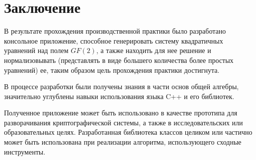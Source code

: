 \chapter*{Заключение} \label{ch-conclusion}

В результате прохождения производственной практики было разработано консольное приложение, способное генерировать систему квадратичных уравнений над полем \(GF(2)\), а также находить для нее решение и нормализовывать (представлять в виде большего количества более простых уравнений) ее, таким образом цель прохождения практики достигнута.

В процессе разработки были получены знания в части основ общей алгебры, значительно углублены навыки использования языка C++ и его библиотек.

Полученное приложение может быть использовано в качестве прототипа для разворачивания криптографической системы, а также в исследовательских или образовательных целях. Разработанная библиотека классов целиком или частично может быть использована при реализации алгоритма, использующего сходные инструменты.

